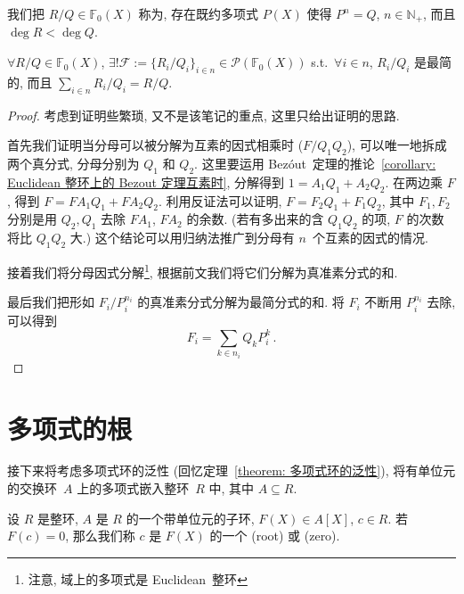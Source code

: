 \documentclass[openany, a5paper, oneside]{ctexbook}
\begin{document}
\begin{definition}[最简分式]
	我们把 $R/Q \in \mathbb F_0(X)$ 称为, 存在既约多项式 $P(X)$ 使得 $P^n = Q$, $n \in \mathbb N_+$, 而且 $\deg R < \deg Q$.
\end{definition}

\begin{theorem}[真分式的最简分式分解]
	$\forall R/Q \in \mathbb F_0(X)$, $\exists! \mathscr F:=\{R_i/Q_i\}_{i \in n} \in \mathscr P(\mathbb F_0(X))$ s.t.\ $\forall i \in n$, $R_i/Q_i$ 是最简的, 而且 $\sum_{i \in n} R_i/Q_i = R/Q$.
\end{theorem}
\begin{proof}
	考虑到证明些繁琐, 又不是该笔记的重点, 这里只给出证明的思路. 
	
	首先我们证明当分母可以被分解为互素的因式相乘时 ($F / Q_1 Q_2$), 可以唯一地拆成两个真分式, 分母分别为 $Q_1$ 和 $Q_2$. 
	这里要运用 Bez\'out~定理的推论~\ref{corollary: Euclidean 整环上的 Bezout 定理互素时}, 
	分解得到 $1 = A_1 Q_1 + A_2 Q_2$. 
	在两边乘 $F$, 得到 $F = F A_1 Q_1 + F A_2 Q_2$. 
	利用反证法可以证明, $F = F_2 Q_1 + F_1 Q_2$, 其中 $F_1, F_2$ 分别是用 $Q_2, Q_1$ 去除 $F A_1$, $F A_2$ 的余数. (若有多出来的含 $Q_1Q_2$ 的项, $F$ 的次数将比 $Q_1 Q_2$ 大.) 这个结论可以用归纳法推广到分母有 $n$~个互素的因式的情况.
	
	接着我们将分母因式分解\footnote{注意, 域上的多项式是 Euclidean~整环}, 根据前文我们将它们分解为真准素分式的和.

	最后我们把形如 $F_i/P_i^{n_i}$ 的真准素分式分解为最简分式的和. 将 $F_i$ 不断用 $P_i^{n_i}$ 去除, 可以得到
	\begin{equation*}
		F_i = \sum_{k \in n_i} Q_k P_i^k\,.
	\end{equation*}
\end{proof}

\section{多项式的根}

接下来将考虑多项式环的泛性 (回忆定理~\ref{theorem: 多项式环的泛性}), 将有单位元的交换环~$A$ 上的多项式嵌入整环~$R$ 中, 其中 $A \subseteq R$. 

\begin{definition}[多项式的根]
	设 $R$ 是整环, $A$ 是 $R$ 的一个带单位元的子环, $F(X) \in A[X]$, $c \in R$.
	若 $F(c) = 0$, 那么我们称 $c$ 是 $F(X)$ 的一个 (root) 或 (zero).
\end{definition}
\end{document}
